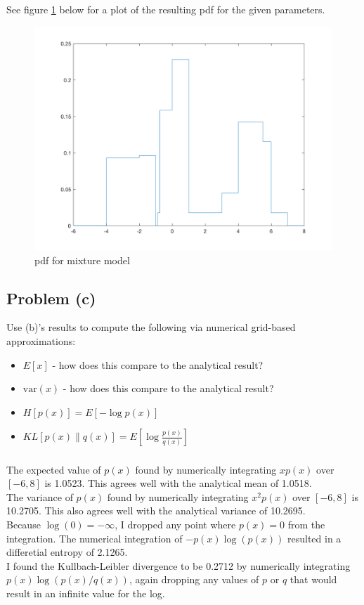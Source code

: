 \documentclass[11pt]{article}
\begin{document}
\subparagraph*{}
See figure \ref{AQ2_plot1} below for a plot of the resulting pdf for the given parameters.
\begin{figure}[h!]
	\centering
	\includegraphics[width=0.6\linewidth]{AQ2_plot1.png}
	\caption{pdf for mixture model}
	\label{AQ2_plot1}
\end{figure}

\subsection*{Problem (c)}
Use (b)'s results to compute the following via numerical grid-based approximations:
\begin{itemize}
	\item $E[x]$ - how does this compare to the analytical result?
	\item $\text{var}(x)$ - how does this compare to the analytical result?
	\item $H[p(x)]=E[-\log p(x)]$
	\item $KL[p(x)\|q(x)] = E[\log\frac{p(x)}{q(x)}]$
\end{itemize}

\subparagraph*{}
The expected value of $p(x)$ found by numerically integrating $xp(x)$ over $[-6,8]$ is 1.0523. This agrees well with the analytical mean of 1.0518. \\
The variance of $p(x)$ found by numerically integrating $x^2p(x)$ over $[-6,8]$ is 10.2705. This also agrees well with the analytical variance of 10.2695. \\
Because $\log(0)=-\infty$, I dropped any point where $p(x)=0$ from the integration. The numerical integration of $-p(x)\log(p(x))$ resulted in a differetial entropy of 2.1265. \\
I found the Kullbach-Leibler divergence to be 0.2712 by numerically integrating $p(x)\log(p(x)/q(x))$, again dropping any values of $p$ or $q$ that would result in an infinite value for the log.
\end{document}
